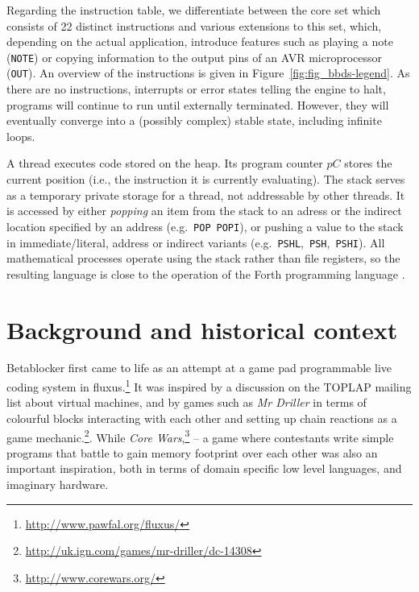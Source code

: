\documentclass[letterpaper, 12pt]{article}
\begin{document}
Regarding the instruction table, we differentiate between the core set which consists of 22 distinct instructions and various extensions to this set, which, depending on the actual application, introduce features such as playing a note (\texttt{NOTE}) or copying information to the output pins of an AVR microprocessor (\texttt{OUT}).
An overview of the instructions is given in Figure~\ref{fig:fig_bbds-legend}.
As there are no instructions, interrupts or error states telling the engine to halt, programs will continue to run until externally terminated.
However, they will eventually converge into a (possibly complex) stable state, including infinite loops.

A thread executes code stored on the heap. 
Its program counter $pC$ stores the current position (i.e., the instruction it is currently evaluating).
The stack serves as a temporary private storage for a thread, not addressable by other threads. 
It is accessed by either \emph{popping} an item from the stack to an adress or the indirect location specified by an address (e.g.~\texttt{POP}~\texttt{POPI}), or pushing a value to the stack in immediate/literal, address or indirect variants  (e.g.~\texttt{PSHL},~\texttt{PSH},~\texttt{PSHI}). All mathematical processes operate using the stack rather than file registers, so the resulting language is close to the operation of the Forth programming language \citep{rather1993-the}.
\parskip 18pt

\section{Background and historical context} 
\label{sec:background}


Betablocker first came to life as an attempt at a game pad programmable live coding system in fluxus.\footnote{
\url{http://www.pawfal.org/fluxus/}
} 
It was inspired by a discussion on the TOPLAP mailing list about virtual machines, and by games such as \emph{Mr Driller} in terms of colourful blocks interacting with each other and setting up chain reactions as a game mechanic.\footnote{
\url{http://uk.ign.com/games/mr-driller/dc-14308}
}. While 
\emph{Core Wars},\footnote{
\url{http://www.corewars.org/}
} -- a game where contestants write simple programs that battle to gain memory footprint over each other was also an important inspiration, both in terms of domain specific low level languages, and imaginary hardware.
\end{document}
